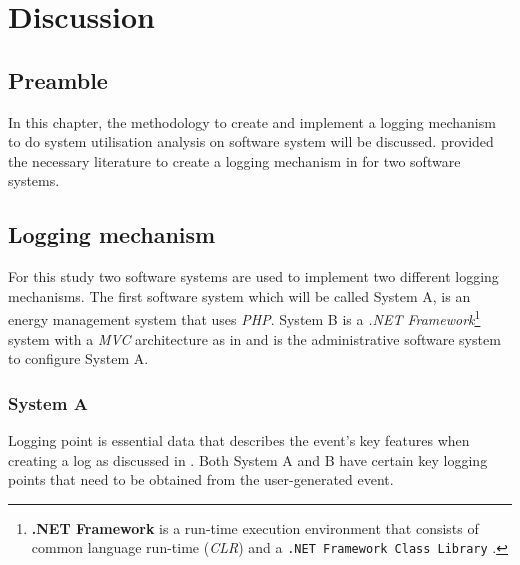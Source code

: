 
\chapter{Discussion}
\label{chap:5}

\section{Preamble}
In this chapter, the methodology to create and implement a logging mechanism to do system utilisation analysis on software system will be discussed.  provided the necessary literature to create a logging mechanism in  for two software systems.

\section{Logging mechanism}\label{sec:Ch3_LoggingMechanism}
For this study two software systems are used to implement two different logging mechanisms. The first software system which will be called System A, is an energy management system that uses \emph{PHP}. System B is a \emph{.NET Framework}\footnote{\label{ftn:NetFramework}\textbf{.NET Framework} is a run-time execution environment that consists of common language run-time (\emph{CLR}) and a \texttt{.NET Framework Class Library} \cite{Harkness2007}.} system with a \emph{MVC} architecture as in  and is the administrative software system to configure System A.

\clearpage

\subsection{System A}
Logging point is essential data that describes the event's key features when creating a log as discussed in . Both System A and B have certain key logging points that need to be obtained from the user-generated event.

